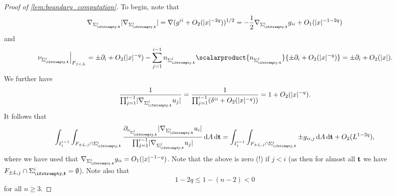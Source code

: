 \documentclass[draft]{amsart}
\newcommand*{\mathcomma}{,}
\newcommand*{\mathfullstop}{.}
\newcommand{\evaluateat}[2]{\left.#1\right\rvert_{#2}}
\DeclarePairedDelimiter{\abs}{\lvert}{\rvert} %
\begin{document}
\begin{proof}[Proof of \cref{lem:boundary_computation}]
    To begin, note that 
    \begin{equation*}
        \nabla_{\nls^i}\abs{\nabla_{\nls^i}}=\nabla(g^{ii}+O_2(\abs{x}^{-2q}))^{1/2}=-\frac{1}{2}\nabla_{\nls^i}g_{ii}+O_1(\abs{x}^{-1-2q})
    \end{equation*}
    and
    \begin{equation*}
        \evaluateat{\nu_{\nls^i}}{F_{\pm i,L}}=\pm \partial_i+O_2(\abs{x}^{-q})-\sum_{j=1}^{i-1}n_{\nls^j}\scalarproduct{n_{\nls^j}}{\pm \partial_i+O_2(\abs{x}^{-q})}=\pm\partial_i+O_2(\abs{x})\mathfullstop
    \end{equation*}
    We further have
    \begin{equation*}
        \frac{1}{\prod_{j=1}^{i-1}\abs{\nabla_{\nls^j}u_j}}=\frac{1}{\prod_{j=1}^{i-1}(\delta^{ii}+O_2(\abs{x}^{-q}))}=1+O_2(\abs{x}^{-q})\mathfullstop
    \end{equation*}
    It follows that
    \begin{equation*}
        \int_{I_1^{i-1}}\int_{F_{\pm L,j}\cap \nls^i}\frac{\partial_{\nu_{\nls^i}}\abs{\nabla_{\nls^i}u_i}}{\prod_{j=1}^{i-1}\abs{\nabla_{\nls^j}u_j}}\odif{A}\odif{\vect{t}}=\int_{I_1^{i-1}}\int_{ F_{\pm L,j}\cap \nls^i}\pm g_{ii,j}\odif{A}\odif{\vect{t}}+O_2(L^{1-2q})\mathcomma
    \end{equation*}
    where we have used that \( \nabla_{\nls^i}g_{ii}=O_1(\abs{x}^{-1-q}) \). Note that the above is zero (!) if \( j<i \) (as then for almost all \( \mathbf{t} \) we have \( F_{\pm L,j}\cap \nls^i=\emptyset \)). Note also that
    \begin{equation*}
        1-2q\leq 1-(n-2)<0
    \end{equation*} 
    for all \( n\geq 3 \).


\end{proof}


\endgroup

\printbibliography
\end{document}
